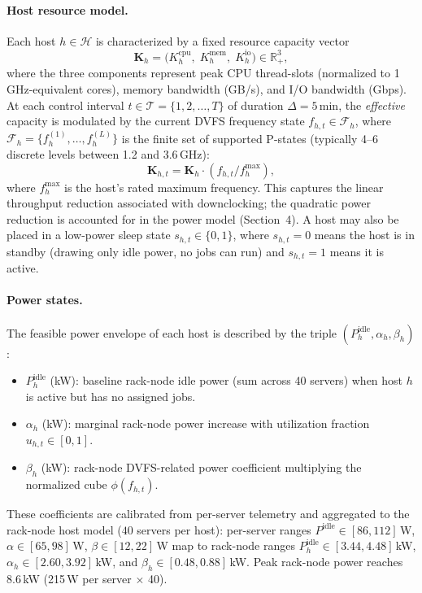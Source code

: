 \documentclass[a4paper,fleqn]{cas-dc}
\begin{document}
\paragraph{Host resource model.}
Each host $h \in \mathcal{H}$ is characterized by a fixed resource capacity vector
\begin{equation}
\mathbf{K}_h = \bigl(K^{\mathrm{cpu}}_h,\; K^{\mathrm{mem}}_h,\; K^{\mathrm{io}}_h\bigr) \in \mathbb{R}^{3}_{+},
\end{equation}
where the three components represent peak CPU thread-slots (normalized to 1\,GHz-equivalent cores), memory bandwidth (GB/s), and I/O bandwidth (Gbps). At each control interval $t \in \mathcal{T} = \{1, 2, \ldots, T\}$ of duration $\Delta = 5$\,min, the \emph{effective} capacity is modulated by the current DVFS frequency state $f_{h,t} \in \mathcal{F}_h$, where $\mathcal{F}_h = \{f^{(1)}_h, \ldots, f^{(L)}_h\}$ is the finite set of supported P-states (typically 4--6 discrete levels between 1.2 and 3.6\,GHz):
\begin{equation}
\mathbf{K}_{h,t} = \mathbf{K}_h \cdot (f_{h,t} / f^{\max}_h),
\end{equation}
where $f^{\max}_h$ is the host's rated maximum frequency. This captures the linear throughput reduction associated with downclocking; the quadratic power reduction is accounted for in the power model (Section~4). A host may also be placed in a low-power sleep state $s_{h,t} \in \{0,1\}$, where $s_{h,t}=0$ means the host is in standby (drawing only idle power, no jobs can run) and $s_{h,t}=1$ means it is active.

\paragraph{Power states.}
The feasible power envelope of each host is described by the triple $(P^{\mathrm{idle}}_h, \alpha_h, \beta_h)$:
\begin{itemize}
  \item $P^{\mathrm{idle}}_h$ (kW): baseline rack-node idle power (sum across 40 servers) when host $h$ is active but has no assigned jobs.
  \item $\alpha_h$ (kW): marginal rack-node power increase with utilization fraction $u_{h,t}\in[0,1]$.
  \item $\beta_h$ (kW): rack-node DVFS-related power coefficient multiplying the normalized cube $\phi(f_{h,t})$.
\end{itemize}
These coefficients are calibrated from per-server telemetry and aggregated to the rack-node host model ($40$ servers per host): per-server ranges $P^{\mathrm{idle}}\in[86,112]$\,W, $\alpha\in[65,98]$\,W, $\beta\in[12,22]$\,W map to rack-node ranges $P^{\mathrm{idle}}_h\in[3.44,4.48]$\,kW, $\alpha_h\in[2.60,3.92]$\,kW, and $\beta_h\in[0.48,0.88]$\,kW. Peak rack-node power reaches 8.6\,kW (215\,W per server $\times$ 40).
\end{document}
